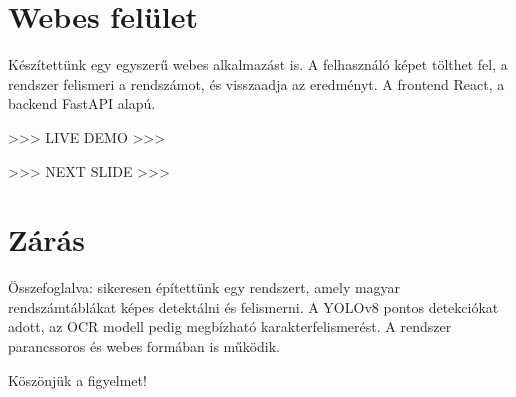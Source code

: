 \documentclass[12pt]{article}
\begin{document}
\section*{Webes felület}

Készítettünk egy egyszerű webes alkalmazást is.
A felhasználó képet tölthet fel, a rendszer felismeri a rendszámot, és visszaadja az eredményt.
A frontend React, a backend FastAPI alapú.

>>> LIVE DEMO >>>

>>> NEXT SLIDE >>>

\section*{Zárás}

Összefoglalva: sikeresen építettünk egy rendszert, amely magyar rendszámtáblákat képes detektálni és felismerni.
A YOLOv8 pontos detekciókat adott, az OCR modell pedig megbízható karakterfelismerést.
A rendszer parancssoros és webes formában is működik.

Köszönjük a figyelmet!
\end{document}
